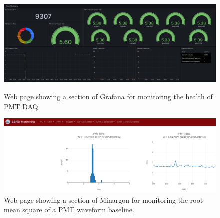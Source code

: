 \begin{figure}[ht!] 
\centering    
\includegraphics[width=1.0\textwidth]{Grafana}
\caption[Grafana Online Monitoring Web Page]{
Web page showing a section of Grafana for monitoring the health of PMT DAQ.
}
\label{fig:Grafana}
\vspace{0.5cm}
\centering    
\includegraphics[width=1.0\textwidth]{Minargon}
\caption[Minargon Online Monitoring Web Page]{
Web page showing a section of Minargon for monitoring the root mean square of a PMT waveform baseline.
}
\label{fig:Minargon}
\end{figure}


